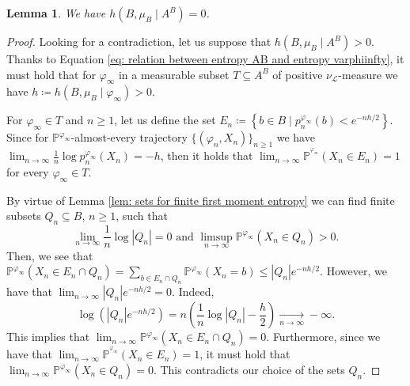 \documentclass[reqno,oneside,11pt]{amsart}
\renewcommand{\P}{\mathbb{P}}
\theoremstyle{plain}
\newtheorem{lem}[thm]{Lemma}
\theoremstyle{definition}
\begin{document}
\begin{lem}\label{lem: hAB 0}
	We have $h\left(B,\mu_B\mid A^B\right)=0$.
\end{lem}
\begin{proof}
	Looking for a contradiction, let us suppose that $h\left(B,\mu_B\mid A^B\right)>0$. Thanks to Equation \eqref{eq: relation between entropy AB and entropy varphiinfty}, it must hold that for $\varphi_{\infty}$ in a measurable subset $T\subseteq A^B$ of positive $\nu_{\mathcal{L}}$-measure we have $h\coloneqq h\left(B,\mu_B\mid \varphi_{\infty}\right)>0$.
	
	For $\varphi_{\infty}\in T$ and  $n\ge 1$, let us define the set $
		E_n\coloneqq \left \{ b\in B\mid p^{\varphi_{\infty}}_n(b)< e^{-nh/2} \right \}.$ Since for $\P^{\varphi_{\infty}}$-almost-every trajectory $\{(\varphi_n,X_n)\}_{n\ge 1}$ we have $\displaystyle\lim_{n\to \infty}\frac{1}{n}\log p^{\varphi_{\infty}}_n(X_n)=-h$,  then it holds that $\lim_{n\to \infty}\P^{^{\varphi_{\infty}}}(X_n\in E_n)=1$ for every $\varphi_{\infty} \in T$.
	
	By virtue of Lemma \ref{lem: sets for finite first moment entropy} we can find finite subsets $Q_n\subseteq B$, $n\ge 1$, such that \begin{equation*}\lim_{n\to \infty}\frac{1}{n}\log|Q_n|= 0\text{ and }\limsup_{n\to \infty} \P^{\varphi_{\infty}}(X_n\in Q_n)>0.
	\end{equation*}
	Then, we see that $\P^{\varphi_{\infty}}\left(X_n\in E_n\cap Q_n\right)=\sum_{b\in E_n \cap Q_n}\P^{\varphi_{\infty}}\left(X_n=b\right)\le |Q_n|e^{-nh/2}.$ 	However, we have that $\lim_{n\to \infty} |Q_n|e^{-nh/2}=0$. Indeed, 
	\begin{equation*}
		\log(|Q_n|e^{-nh/2})=n\left( \frac{1}{n}\log|Q_n| -\frac{h}{2} \right)\xrightarrow[n\to \infty]{}-\infty.
	\end{equation*}
	This implies that $\lim_{n\to \infty}\P^{\varphi_{\infty}}\left(X_n\in E_n\cap Q_n\right)=0$. Furthermore, since we have that $\lim_{n\to \infty}\P^{^{\varphi_{\infty}}}(X_n\in E_n)=1$, it must hold that $\lim_{n\to \infty}\P^{\varphi_{\infty}}\left(X_n\in Q_n\right)=0$. This contradicts our choice of the sets $Q_n$.
\end{proof}


\end{document}
